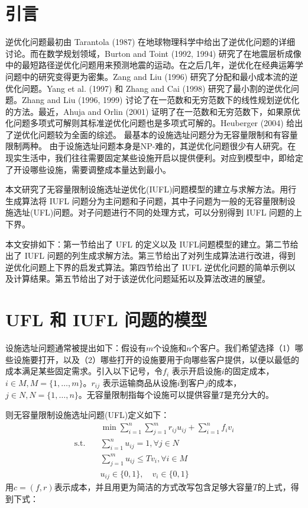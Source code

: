\documentclass[UTF8]{article}
\begin{document}
\section{引言}

逆优化问题最初由 Tarantola (1987) 在地球物理科学中给出了逆优化问题的详细讨论。而在数学规划领域，Burton and Toint (1992, 1994) 研究了在地震层析成像中的最短路径逆优化问题用来预测地震的运动。在之后几年，逆优化在经典运筹学问题中的研究变得更为密集。Zang and Liu (1996) 研究了分配和最小成本流的逆优化问题。Yang et al. (1997) 和 Zhang and Cai (1998) 研究了最小割的逆优化问题。Zhang and Liu (1996, 1999) 讨论了在一范数和无穷范数下的线性规划逆优化的方法。最近，Ahuja and Orlin (2001) 证明了在一范数和无穷范数下，如果原优化问题多项式可解则其标准逆优化问题也是多项式可解的。Heuberger (2004) 给出了逆优化问题较为全面的综述。
最基本的设施选址问题分为无容量限制和有容量限制两种。
由于设施选址问题本身是NP-难的，其逆优化问题很少有人研究。在现实生活中，我们往往需要固定某些设施开启以提供便利。对应到模型中，即给定了开设哪些设施，需要调整成本量达到最小。

本文研究了无容量限制设施选址逆优化(IUFL)问题模型的建立与求解方法。用行生成算法将 IUFL 问题分为主问题和子问题，其中子问题为一般的无容量限制设施选址(UFL)问题。对子问题进行不同的处理方式，可以分别得到 IUFL 问题的上下界。

本文安排如下：第一节给出了 UFL 的定义以及 IUFL问题模型的建立。第二节给出了 IUFL 问题的列生成求解方法。第三节给出了对列生成算法进行改进，得到逆优化问题上下界的启发式算法。第四节给出了 IUFL 逆优化问题的简单示例以及计算结果。第五节给出了对于该逆优化问题延拓以及算法改进的展望。

\section{ UFL 和 IUFL 问题的模型}

设施选址问题通常被提出如下：假设有$m$个设施和$n$个客户。我们希望选择（1）哪些设施要打开，以及（2）哪些打开的设施要用于向哪些客户提供，以便以最低的成本满足某些固定需求。引入以下记号，令$f_i$ 表示开启设施$i$的固定成本，$i \in M, M=\{1,\ldots,m\}$。$r_{ij}$ 表示运输商品从设施$i$到客户$j$的成本，$j \in N, N=\{1,\ldots,n\}$。无容量限制指每个设施可以提供容量$T$是充分大的。

则无容量限制设施选址问题(UFL)定义如下：
\begin{align*}
&\min \sum_{i=1}^n \sum_{j=1}^m r_{ij}u_{ij} + \sum_{i=1}^n f_i v_i \\
\text{s.t.}\quad & \sum_{i=1}^n u_{ij} =1, \forall j \in N  \\
&\sum_{j=1}^m u_{ij}  \leq Tv_i, \forall i \in M \\
& u_{ij} \in \{0,1\}, \quad v_{i} \in \{0,1\}
\end{align*}
用$c=(f,r)$表示成本，并且用更为简洁的方式改写包含足够大容量$T$的上式，得到下式：
\end{document}
